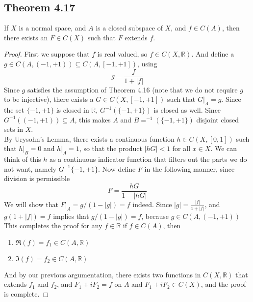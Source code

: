 \documentclass[../../main.tex]{subfiles}
\begin{document}
\subsection{Theorem 4.17}
\begin{wts}
If $X$ is a normal space, and $A$ is a closed subspace of $X$, and $f\in C(A)$, then there exists an $F\in C(X)$ such that $F$ extends $f$.
\end{wts}
\begin{proof}
First we suppose that $f$ is real valued, so $f\in C(X, \mathbb{R})$. And define a $g\in C(A, (-1, +1))\subseteq C(A, [-1,+1])$, using
\[
g= \dfrac{f}{1+|f|}
\]
Since $g$ satisfies the assumption of Theorem 4.16 (note that we do not require $g$ to be injective), there exists a $G\in C(X, [-1, +1])$ such that $G|_A = g$. Since the set $\{-1,+1\}$ is closed in $\mathbb{R}$, $G^{-1}(\{-1,+1\})$ is closed as well. Since $G^{-1}((-1,+1))\subseteq A$, this makes $A$ and $B=^{-1}(\{-1,+1\})$ disjoint closed sets in $X$.\\

By Urysohn's Lemma, there exists a continuous function $h\in C(X, [0,1])$ such that $h|_B = 0$ and $h|_A =1$, so that the product $|hG|< 1$ for all $x\in X$. We can think of this $h$ as a continuous indicator function that filters out the parts we do not want, namely $G^{-1}\{-1,+1\}$. Now define $F$ in the following manner, since division is permissible
\[
F = \dfrac{hG}{1-|hG|}
\]
We will show that $F|_A = g/(1-|g|) = f$ indeed. Since $|g| = \frac{|f|}{1+|f|}$, and $g(1+|f|) = f$ implies that $g/(1-|g|) = f$, because $g\in C(A,(-1,+1))$ This completes the proof for any $f\in\mathbb{R}$ if $f\in C(A)$, then
\begin{enumerate}
    \item $\Re(f) = f_1\in C(A,\mathbb{R})$
    \item $\Im(f) = f_2\in C(A,\mathbb{R})$
\end{enumerate}
And by our previous argumentation, there exists two functions in $C(X, \mathbb{R})$ that extends $f_1$ and $f_2$, and $F_1 + iF_2 = f$ on $A$ and $F_1 + iF_2\in C(X)$, and the proof is complete.
\end{proof}
\end{document}
